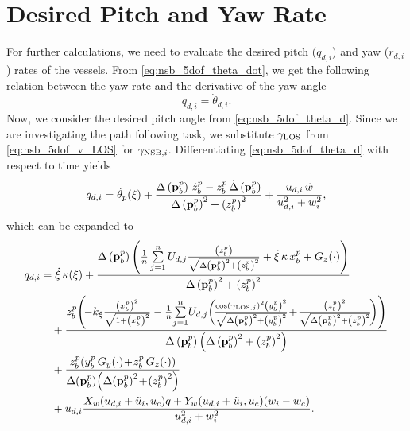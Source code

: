 \section{Desired Pitch and Yaw Rate}
For further calculations, we need to evaluate the desired pitch ($q_{d,i}$) and yaw ($r_{d,i}$) rates of the vessels.
From \eqref{eq:nsb_5dof_theta_dot}, we get the following relation between the yaw rate and the derivative of the yaw angle
\begin{equation}
    q_{d,i} = \dot{\theta}_{d,i}.
\end{equation}
Now, we consider the desired pitch angle from \eqref{eq:nsb_5dof_theta_d}.
Since we are investigating the path following task, we substitute $\gamma_{\rm LOS}$ from \eqref{eq:nsb_5dof_v_LOS} for $\gamma_{{\rm NSB}, i}$.
Differentiating \eqref{eq:nsb_5dof_theta_d} with respect to time yields
\begin{equation}
    q_{d,i} = \dot{\theta}_p(\xi) + \frac{\Delta\left(\mathbf{p}_b^p\right)\,\dot{z}_b^p - z_b^p\,\dot{\Delta}\left(\mathbf{p}_b^p\right)}{\Delta\left(\mathbf{p}_b^p\right)^2 + \left(z_b^p\right)^2} + \frac{u_{d,i}\,\dot{w}}{u_{d,i}^2 + w_i^2},
\end{equation}
which can be expanded to
\begin{equation}
    \begin{split}
        q_{d,i} &= \dot{\xi}\,\kappa(\xi) + \frac{\Delta\left(\mat{p}_b^p\right)\left(\frac{1}{n} \sum\limits_{j=1}^n U_{d,j}\frac{\left(z_b^p\right)}{\sqrt{\Delta\left(\mat{p}_b^p\right)^2 + \left(z_b^p\right)^2}} + \dot{\xi}\,\kappa\,x_b^p + G_z(\cdot)\right)}{\Delta\left(\mat{p}_b^p\right)^2 + \left(z_b^p\right)^2} \\
        &\quad + \frac{z_b^p\!\left(\!-k_{\xi}\frac{\left(x_b^p\right)^2}{\sqrt{1+\left(x_b^p\right)^2}} - \frac{1}{n}\!\sum\limits_{j=1}^n \!U_{d,j}\!\left(\!\scale[1]{\frac{\cos\left(\gamma_{{\rm LOS},j}\right)^2\left(y_b^p\right)^2}{\sqrt{\Delta\left(\mat{p}_b^p\right)^2 + \left(y_b^p\right)^2}}}\! + \!\frac{\left(z_b^p\right)^2}{\sqrt{\Delta\left(\mat{p}_b^p\right)^2 + \left(z_b^p\right)^2}}\!\right)\right)}{\Delta\left(\mat{p}_b^p\right)\left(\Delta\left(\mat{p}_b^p\right)^2 + \left(z_b^p\right)^2\right)} \\
        &\quad + \frac{z_b^p\!\left(y_b^p\,G_y(\cdot) \!+\! z_b^p\,G_z(\cdot)\right)}{\Delta\!\left(\mat{p}_b^p\right)\!\left(\Delta\!\left(\mat{p}_b^p\right)^2 \!+\! \left(z_b^p\right)^2\right)} \\
        & \quad + u_{d,i}\frac{X_w\!\left(u_{d,i}+\tilde{u}_i, u_c\right)\!q + Y_w\!\left(u_{d,i}+\tilde{u}_i, u_c\right)\!\left(w_i - w_c\right)}{u_{d,i}^2 + w_i^2}.
    \end{split}
    \label{eq:nsb_5dof_q_d}
\end{equation}

